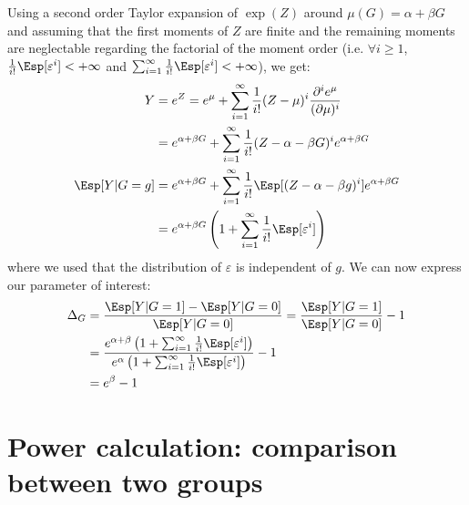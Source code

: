 \documentclass[12pt]{article}
\begin{document}
Using a second order Taylor expansion of \(\exp(Z)\) around
\(\mu(G)=\alpha + \beta G\) and assuming that the first moments of
\(Z\) are finite and the remaining moments are neglectable regarding
the factorial of the moment order (i.e. \(\forall i \geq 1\),
\(\frac{1}{i!}\Esp[\varepsilon^i ]< +\infty\) and \(\sum_{i=1}^{\infty} \frac{1}{i!}\Esp[\varepsilon^i ]< +\infty\)), we get:
\begin{align*}
Y &= e^{Z} = e^{\mu} + \sum_{i=1}^{\infty} \frac{1}{i!} (Z - \mu)^i \frac{\partial^i e^{\mu}}{(\partial \mu)^i} \\
&= e^{\alpha + \beta G} + \sum_{i=1}^{\infty} \frac{1}{i!} (Z - \alpha - \beta G)^i e^{\alpha + \beta G} \\
\Esp[Y|G=g] &= e^{\alpha + \beta G} + \sum_{i=1}^{\infty} \frac{1}{i!} \Esp[(Z - \alpha - \beta g)^i] e^{\alpha + \beta G} \\
&= e^{\alpha + \beta G} \left(1 + \sum_{i=1}^{\infty} \frac{1}{i!} \Esp[\varepsilon^i] \right)
\end{align*}
where we used that the distribution of \(\varepsilon\) is independent
of \(g\). We can now express our parameter of interest:
\begin{align*}
\Delta_G &= \frac{\Esp[Y|G=1]-\Esp[Y|G=0]}{\Esp[Y|G=0]} = \frac{\Esp[Y|G=1]}{\Esp[Y|G=0]} - 1 \\
&= \frac{e^{\alpha + \beta} \left(1 + \sum_{i=1}^{\infty} \frac{1}{i!} \Esp[\varepsilon^{i}] \right)}{e^{\alpha} \left(1 + \sum_{i=1}^{\infty} \frac{1}{i!} \Esp[\varepsilon^{i}] \right)} - 1 \\
&= e^{\beta} - 1
\end{align*}


\clearpage

\section{Power calculation: comparison between two groups}
\label{sec:org6b8962e}
\end{document}
